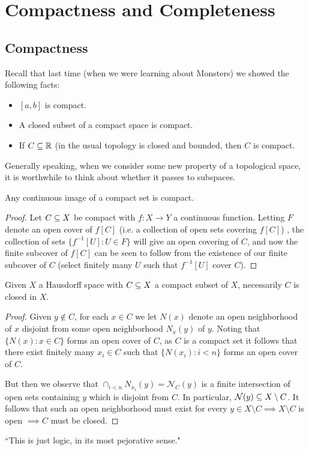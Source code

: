 \section{Compactness and Completeness}

\subsection{Compactness}
Recall that last time (when we were learning about Monsters) we showed the following facts: 
\begin{itemize}
    \item $[a,b]$ is compact.
    \item A closed subset of a compact space is compact.
    \item If $C\subseteq\mathbb{R}$ (in the usual topology is closed and bounded, then $C$ is compact.
\end{itemize}
Generally speaking, when we consider some new property of a topological space, it is worthwhile to think about whether it passes to subspaces.

\begin{boxlemma}
    Any continuous image of a compact set is compact.
\end{boxlemma}
\begin{proof}
    Let $C\subseteq X$ be compact with $f:X\rightarrow Y$ a continuous function. Letting $F$ denote an open cover of $f[C]$ (i.e. a collection of open sets covering $f[C]$) , the collection of sets $\{f^{-1}[U]: U\in F\}$ will give an open covering of $C$, and now the finite subcover of $f[C]$ can be seen to follow from the existence of our finite subcover of $C$ (select finitely many $U$ such that $f^{-1}[U]$ cover $C$). 
\end{proof}
\begin{boxlemma}
    Given $X$ a Hausdorff space with $C\subseteq X$ a compact subset of $X$, necessarily $C$ is closed in $X$.
\end{boxlemma}
\begin{proof}
    Given $y\notin C$, for each $x\in C$ we let $N(x)$ denote an open neighborhood of $x$ disjoint from some open neighborhood $N_x(y)$ of $y$. Noting that $\{N(x):x\in C\}$ forms an open cover of $C$, as $C$ is a compact set it follows that there exist finitely many $x_i\in C$ such that $\{N(x_i):i<n\}$ forms an open cover of $C$. 
    
    But then we observe that $\cap_{i<n}N_{x_i}(y)=\mathcal{N}_C(y)$ is a finite intersection of open sets containing $y$ which is disjoint from $C$. In particular, $\mathcal{N}(y)\subseteq X\setminus C$. It follows that such an open neighborhood must exist for every $y\in X\setminus C\implies X\setminus C$ is open $\implies C$ must be closed.
\end{proof}
\begin{remark}
    ``This is just logic, in its most pejorative sense."
\end{remark}

